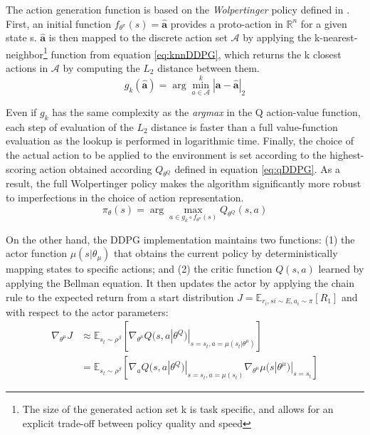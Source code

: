 The action generation function is based on the \textit{Wolpertinger} policy defined in \cite{Dulac-Arnold2015}. First, an initial function $f_{\theta^{\pi}}(s) = \hat{\mathbf{a}}$ provides a proto-action in $\mathbb{R}^n$ for a given state s. $\hat{\mathbf{a}}$ is then mapped to the discrete action set $\mathcal{A}$ by applying the k-nearest-neighbor\footnote{The size of the generated action set k is task specific, and allows for an explicit trade-off between policy quality and speed} function from equation \ref{eq:knnDDPG}, which returns the k closest actions in $\mathcal{A}$ by computing the $L_2$ distance between them.
\begin{equation}
\label{eq:knnDDPG}
g_k(\hat{\mathbf{a}}) = \arg\min^k_{a \in \mathcal{A}} | \mathbf{a} - \mathbf{\hat{\mathbf{a}}} |_2
\end{equation}

Even if $g_k$ has the same complexity as the \textit{argmax} in the Q action-value function, each step of evaluation of the $L_2$ distance is faster than a full value-function evaluation as the lookup is performed in logarithmic time. Finally, the choice of the actual action to be applied to the environment is set according to the highest-scoring action obtained according $Q_{\theta^Q}$ defined in equation \ref{eq:qDDPG}. As a result, the full Wolpertinger policy makes the algorithm significantly more robust to imperfections in the choice of action representation.
\begin{equation}
\label{eq:qDDPG}
\pi_{\theta}(s) = \arg\max_{a \in g_k \circ f_{\theta^{\pi}}(s) } Q_{\theta^Q}(s, a)
\end{equation}

On the other hand, the DDPG implementation maintains two functions: (1) the actor function $\mu(s|\theta_{\mu})$ that obtains the current policy by deterministically mapping states to specific actions; and (2) the critic function $Q(s,a)$ learned by applying the Bellman equation. It then updates the actor by applying the chain rule to the expected return from a start distribution $J = \mathbb{E}_{r_i, si \sim E, a_i \sim \pi}[R_1]$ and with respect to the actor parameters:
\begin{equation}
\label{}
\begin{aligned}
\nabla_{\theta^{\mu}}J & \approx \mathbb{E}_{s_t \sim \rho^{\beta}} [\nabla_{\theta^{\mu}} Q(s, a | \theta^Q)|_{s=s_t, a=\mu(s_t|\theta^{\mu})} ] \\
& = \mathbb{E}_{s_t \sim \rho^{\beta}} [\nabla_a Q(s, a | \theta^Q)|_{s=s_t, a=\mu(s_t)}  \nabla_{\theta^{\mu}} \mu(s|\theta^{\mu})|_{s=s_t}]
\end{aligned}
\end{equation}

